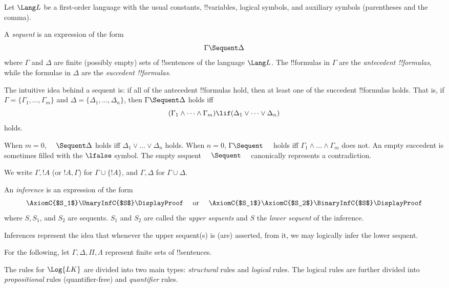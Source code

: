 \documentclass[../../include/open-logic-section]{subfiles}
\begin{document}


Let $\Lang L$ be a first-order language with the usual constants,
!!{variable}s, logical symbols, and auxiliary symbols (parentheses
and the comma).

\begin{defn}[sequent]
A \emph{sequent} is an expression of the form
\[ \Gamma \Sequent \Delta \]
where $\Gamma$ and $\Delta$ are finite (possibly empty) sets of
!!{sentence}s of the language $\Lang L$. The !!{formula}s in $\Gamma$
are the \emph{antecedent !!{formula}s}, while the formulae in $\Delta$ are
the \emph{succedent !!{formula}s}.

The intuitive idea behind a sequent is: if all of the antecedent
!!{formula}s hold, then at least one of the succedent !!{formula}s
holds. That is, if $\Gamma = \{ \Gamma_1, \dots, \Gamma_m\}$ and
$\Delta = \{ \Delta_1, \dots, \Delta_n\}$, then $\Gamma \Sequent
\Delta$ holds iff
\[ 
(\Gamma_1 \land \cdots \land \Gamma_m) \lif (\Delta_1 \lor \cdots \lor
\Delta_n) \] holds.

When $m=0$, $\quad \Sequent \Delta$ holds iff $\Delta_1 \lor \dots
\lor \Delta_n$ holds. When $n=0$, $\Gamma \Sequent \quad$ holds iff
$\Gamma_1 \land \dots \land \Gamma_m$ does not. An empty succedent is
sometimes filled with the $\lfalse$ symbol. The empty sequent
$\quad \Sequent \quad$ canonically represents a
contradiction.
\end{defn}

We write $\Gamma, !A$ (or $!A, \Gamma$) for $\Gamma \cup \{!A\}$, and
$\Gamma, \Delta$ for $\Gamma \cup \Delta$.

\begin{defn}[Inference]
An \emph{inference} is an expression of the form
\[
\AxiomC{$S_1$}
\UnaryInfC{$S$}
\DisplayProof
\quad
\textrm{  or  }
\quad
\AxiomC{$S_1$}
\AxiomC{$S_2$}
\BinaryInfC{$S$}
\DisplayProof
\]
where $S, S_1$, and $S_2$ are sequents. $S_1$ and $S_2$ are called the
\emph{upper sequents} and $S$ the \emph{lower sequent} of the
inference.

Inferences represent the idea that whenever the upper sequent(s) is
(are) asserted, from it, we may logically infer the lower sequent.
\end{defn}

For the following, let $\Gamma, \Delta, \Pi, \Lambda$ represent finite
sets of !!{sentence}s.

The rules for $\Log{LK}$ are divided into two main types:
\emph{structural} rules and \emph{logical} rules. The logical rules
are further divided into \emph{propositional} rules (quantifier-free)
and \emph{quantifier} rules.
\end{document}
